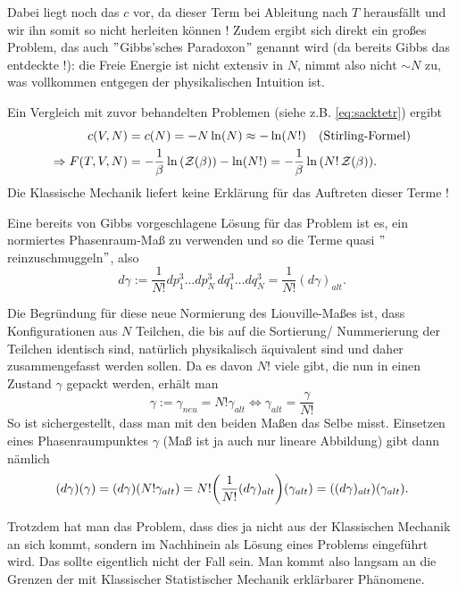 \documentclass[../KlassMech_main.tex]{subfiles}
\begin{document}
Dabei liegt noch das $c$ vor, da dieser Term bei Ableitung nach $T$ herausfällt und wir ihn somit so nicht herleiten können ! Zudem ergibt sich direkt ein großes Problem, das auch $"$Gibbs'sches Paradoxon$"$ genannt wird (da bereits Gibbs das entdeckte !): die Freie Energie ist nicht extensiv in $N$, nimmt also nicht $\sim N$ zu, was vollkommen entgegen der physikalischen Intuition ist.

Ein Vergleich mit zuvor behandelten Problemen (siehe z.B. \eqref{eq:sacktetr}) ergibt
\begin{align}\label{key}
c(V, N) &= c(N) = -N \ln(N) \approx -\ln(N!) \quad (\text{Stirling-Formel})
\\
\Rightarrow F(T, V, N) &= -\frac{1}{\beta} \ln\qty(\mathcal{Z}(\beta)) -\ln(N!)  = -\frac{1}{\beta} \ln\qty(N! \, \mathcal{Z}(\beta)) .
\end{align}
Die Klassische Mechanik liefert keine Erklärung für das Auftreten dieser Terme !


Eine bereits von Gibbs vorgeschlagene Lösung für das Problem ist es, ein normiertes Phasenraum-Maß zu verwenden und so die Terme quasi $"$reinzuschmuggeln$"$, also
\begin{equation}\label{key}
d\gamma := \frac{1}{N!} dp^3_1 \dots dp^3_N \, dq^3_1 \dots dq^3_N = \frac{1}{N!} (d\gamma)_{alt} .
\end{equation}


Die Begründung für diese neue Normierung des Liouville-Maßes ist, dass Konfigurationen aus $N$ Teilchen, die bis auf die Sortierung/ Nummerierung der Teilchen identisch sind, natürlich physikalisch äquivalent sind und daher zusammengefasst werden sollen. Da es davon $N!$ viele gibt, die nun in einen Zustand $\gamma$ gepackt werden, erhält man
\begin{equation}\label{key}
\gamma := \gamma_{neu} = N! \gamma_{alt} \Leftrightarrow \gamma_{alt} = \frac{\gamma}{N!}
\end{equation}
So ist sichergestellt, dass man mit den beiden Maßen das Selbe misst. Einsetzen eines Phasenraumpunktes $\gamma$ (Maß ist ja auch nur lineare Abbildung) gibt dann nämlich
\begin{equation}\label{key}
(d\gamma)(\gamma) = (d\gamma)\qty(N! \gamma_{alt}) = N! \qty(\frac{1}{N!} (d\gamma)_{alt})\qty(\gamma_{alt}) = \qty((d\gamma)_{alt})\qty(\gamma_{alt}) .
\end{equation}

Trotzdem hat man das Problem, dass dies ja nicht aus der Klassischen Mechanik an sich kommt, sondern im Nachhinein als Lösung eines Problems eingeführt wird. Das sollte eigentlich nicht der Fall sein. Man kommt also langsam an die Grenzen der mit Klassischer Statistischer Mechanik erklärbarer Phänomene.\\
\end{document}
